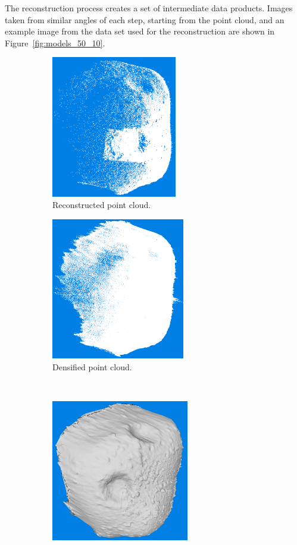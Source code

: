 The reconstruction process creates a set of intermediate data products. Images taken from similar angles of each step, starting from the point cloud, and an example image from the data set used for the reconstruction are shown in Figure~\ref{fig:models_50_10}.

\begin{figure}[htb]
    \centering
        \begin{subfigure}[b]{0.42\textwidth}
            \centering
            \includegraphics[width=\textwidth,height=6.2cm]{doc/thesis/0_figures/models_quality/50_10/120_50_10_point1.png}
            \caption{Reconstructed point cloud.}
            \label{fig:models_50_10_point}
        \end{subfigure}
        \begin{subfigure}[b]{0.42\textwidth}
            \centering
            \includegraphics[width=\textwidth,height=6.2cm]{doc/thesis/0_figures/models_quality/50_10/120_50_10_dense1.png}
            \caption{Densified point cloud.}
            \label{fig:models_50_10_dense}
        \end{subfigure}
        \\
        \begin{subfigure}[b]{0.42\textwidth}
            \centering
            \includegraphics[width=\textwidth,height=6.2cm]{doc/thesis/0_figures/models_quality/50_10/120_50_10_mesh1.png}

\end{subfigure}
\end{figure}
